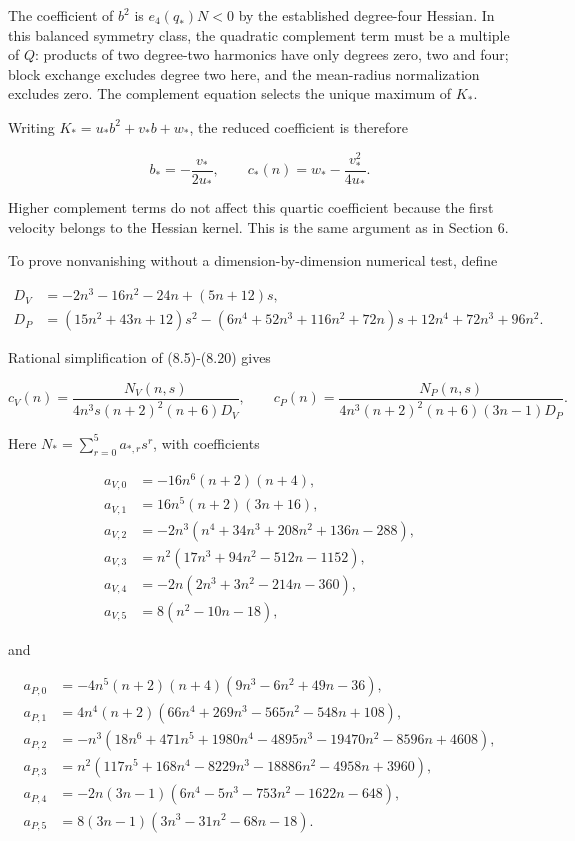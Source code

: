 \documentclass[11pt]{article}
\begin{document}
The coefficient of \(b^2\) is \(e_4(q_*)N<0\) by the established
degree-four Hessian. In this balanced symmetry class, the quadratic
complement term must be a multiple of \(Q\): products of two degree-two
harmonics have only degrees zero, two and four; block exchange excludes
degree two here, and the mean-radius normalization excludes zero. The
complement equation selects the unique maximum of \(K_*\).

Writing \(K_*=u_*b^2+v_*b+w_*\), the reduced coefficient is therefore

\[
b_*=-\frac{v_*}{2u_*},\qquad c_*(n)=w_*-\frac{v_*^2}{4u_*}.
\tag{8.20}
\]

Higher complement terms do not affect this quartic coefficient because
the first velocity belongs to the Hessian kernel. This is the same
argument as in Section 6.

To prove nonvanishing without a dimension-by-dimension numerical test,
define

\[
\begin{aligned}
D_V&=-2n^3-16n^2-24n+(5n+12)s,\\
D_P&=(15n^2+43n+12)s^2
-(6n^4+52n^3+116n^2+72n)s+12n^4+72n^3+96n^2.
\end{aligned}
\tag{8.21}
\]

Rational simplification of (8.5)-(8.20) gives

\[
c_V(n)=\frac{N_V(n,s)}{4n^3s(n+2)^2(n+6)D_V},\qquad
c_P(n)=\frac{N_P(n,s)}{4n^3(n+2)^2(n+6)(3n-1)D_P}.
\tag{8.22}
\]

Here \(N_*=\sum_{r=0}^5 a_{*,r}s^r\), with coefficients

\[
\begin{aligned}
a_{V,0}&=-16n^6(n+2)(n+4),\\
a_{V,1}&=16n^5(n+2)(3n+16),\\
a_{V,2}&=-2n^3(n^4+34n^3+208n^2+136n-288),\\
a_{V,3}&=n^2(17n^3+94n^2-512n-1152),\\
a_{V,4}&=-2n(2n^3+3n^2-214n-360),\\
a_{V,5}&=8(n^2-10n-18),
\end{aligned}
\tag{8.23}
\]

and

\[
\begin{aligned}
a_{P,0}&=-4n^5(n+2)(n+4)(9n^3-6n^2+49n-36),\\
a_{P,1}&=4n^4(n+2)(66n^4+269n^3-565n^2-548n+108),\\
a_{P,2}&=-n^3(18n^6+471n^5+1980n^4-4895n^3-19470n^2-8596n+4608),\\
a_{P,3}&=n^2(117n^5+168n^4-8229n^3-18886n^2-4958n+3960),\\
a_{P,4}&=-2n(3n-1)(6n^4-5n^3-753n^2-1622n-648),\\
a_{P,5}&=8(3n-1)(3n^3-31n^2-68n-18).
\end{aligned}
\tag{8.24}
\]
\end{document}

